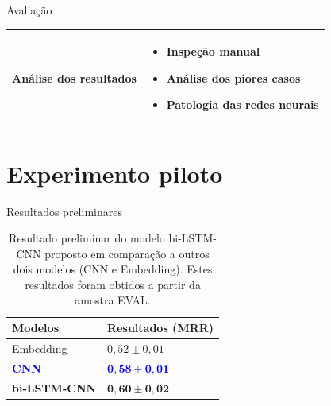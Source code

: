 \documentclass[10pt]{beamer}
\begin{document}
\begin{frame}{Avaliação}
   \begin{center}
       \begin{tabular}{|p{4cm}|p{4cm}|}
            \hline
            Análise dos resultados & \begin{itemize}
                \item Inspeção manual
                \item Análise dos piores casos
                \item Patologia das redes neurais \cite{feng-etal-2018-pathologies}
            \end{itemize} \\
            \hline
       \end{tabular}
   \end{center}
\end{frame}

\section{Experimento piloto}


\begin{frame}{Resultados preliminares}
  \begin{table}[h]
\centering
\begin{tabular}{ p{3cm} p{3cm} }
 \hline
 \textbf{Modelos} & \textbf{Resultados (MRR)}\\
 \hline
 Embedding & $0,52 \pm 0,01$\\
 
 \textcolor{blue}{\textbf{CNN}} & \textcolor{blue}{$\bm{0,58} \pm \bm{0,01}$} \\
 
 \textbf{bi-LSTM-CNN} & $\bm{0,60} \pm \bm{0,02}$\\
 \hline
\end{tabular}
\caption{Resultado preliminar do modelo bi-LSTM-CNN proposto em comparação a outros dois modelos (CNN e Embedding). Estes resultados foram obtidos a partir da amostra EVAL.}
\label{table:resultados-preliminares}
\end{table}
\end{frame}
\end{document}
